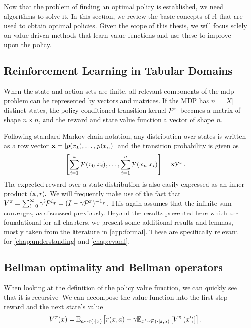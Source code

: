 
Now that the problem of finding an optimal policy is established, we need algorithms to solve it.
In this section, we review the basic concepts of \ac{rl} that are used to obtain optimal policies.
Given the scope of this thesis, we will focus solely on value driven methods that learn value functions and use these to improve upon the policy.

\subsection{Reinforcement Learning in Tabular Domains}

When the state and action sets are finite, all relevant components of the \ac{mdp} problem can be represented by vectors and matrices.
If the MDP has $n = |X|$ distinct states, the policy-conditioned transition kernel $\P^\pi$ becomes a matrix of shape $n \times n$, and the reward and state value function a vector of shape $n$.

Following standard Markov chain notation, any distribution over states is written as a row vector $\mathbf{\state} = [p(\state_1),\dots, p(\state_n)]$ and the transition probability is given as $$\left[\sum_{i=1}^n \P(\state_0|\state_i), \dots, \sum_{i=1}^n \P(\state_n|\state_i)\right] = \mathbf{\state} \P^\pi.$$
The expected reward over a state distribution is also easily expressed as an inner product $\langle \mathbf{\state},r\rangle.$
We will frequently make use of the fact that $V^\pi = \sum_{i=0}^\infty \gamma^i \P^i r = (I - \gamma \P^\pi)^{-1}r$.
This again assumes that the infinite sum converges, as discussed previously.
Beyond the results presented here which are foundational for all chapters, we present some additional results and lemmas, mostly taken from the literature in \autoref{app:formal}.
These are specifically relevant for \autoref{chap:understanding} and \autoref{chap:cvaml}.

\subsection{Bellman optimality and Bellman operators}

When looking at the definition of the policy value function, we can quickly see that it is recursive.
We can decompose the value function into the first step reward and the next state's value $$V^\pi(\state) = \mathbb{E}_{a\sim\pi(\cdot|\state)}\left[r(\state,a) + \gamma \mathbb{E}_{\state'\sim\P(\cdot|\state,a)}\left[V^\pi\left(\state'\right)\right]\right].$$

